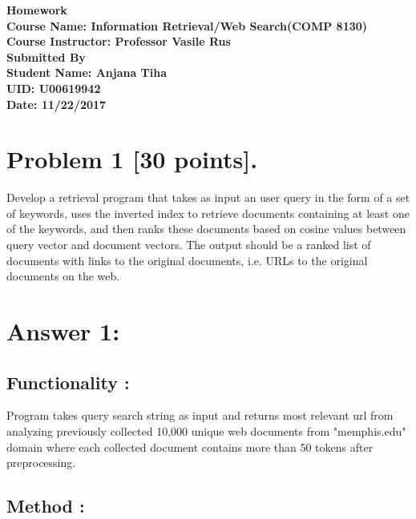 \documentclass[12pt]{article}
\begin{document}
	\begin{titlepage}
		
		\begin{center}
			\begin{large}
			\vspace*{11em}
			\textbf{
			Homework\\
			\vspace{2em}
			Course Name: Information Retrieval/Web Search(COMP 8130)\\
			\vspace{0.5em}
			Course Instructor: Professor Vasile Rus\\
			\vspace{2em}
			Submitted By\\
			\vspace{1em}
			Student Name: Anjana Tiha\\
			UID: U00619942\\
			Date: 11/22/2017\\
			}
			\end{large}

		\end{center}
		
	\end{titlepage}
	\newpage
\section*{Problem 1 [30 points].}
Develop a retrieval program that takes as input an user query in the form of a set of keywords, uses the inverted index to retrieve documents containing
at least one of the keywords, and then ranks these documents based on
cosine values between query vector and document vectors. The output should be a ranked list of documents with links to the original documents, i.e. URLs to the original documents on the web.
\section*{Answer 1:}
\subsection*{Functionality : }
Program takes query search string as input and returns most relevant url from analyzing previously collected 10,000 unique web documents from "memphis.edu" domain where each collected document contains more than 50 tokens after preprocessing.
\subsection*{Method : }
\end{document}
